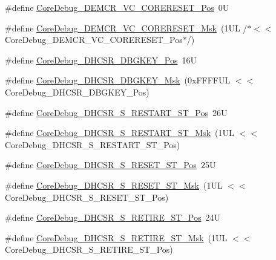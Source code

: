 \begin{DoxyCompactItemize}
\item 
\#define \mbox{\hyperlink{group___c_m_s_i_s___core_debug_ga9fcf09666f7063a7303117aa32a85d5a}{Core\+Debug\+\_\+\+D\+E\+M\+C\+R\+\_\+\+V\+C\+\_\+\+C\+O\+R\+E\+R\+E\+S\+E\+T\+\_\+\+Pos}}~0U
\item 
\#define \mbox{\hyperlink{group___c_m_s_i_s___core_debug_ga906476e53c1e1487c30f3a1181df9e30}{Core\+Debug\+\_\+\+D\+E\+M\+C\+R\+\_\+\+V\+C\+\_\+\+C\+O\+R\+E\+R\+E\+S\+E\+T\+\_\+\+Msk}}~(1\+U\+L /$\ast$$<$$<$ Core\+Debug\+\_\+\+D\+E\+M\+C\+R\+\_\+\+V\+C\+\_\+\+C\+O\+R\+E\+R\+E\+S\+E\+T\+\_\+\+Pos$\ast$/)
\item 
\#define \mbox{\hyperlink{group___c_m_s_i_s___core_debug_gac91280edd0ce932665cf75a23d11d842}{Core\+Debug\+\_\+\+D\+H\+C\+S\+R\+\_\+\+D\+B\+G\+K\+E\+Y\+\_\+\+Pos}}~16U
\item 
\#define \mbox{\hyperlink{group___c_m_s_i_s___core_debug_ga1ce997cee15edaafe4aed77751816ffc}{Core\+Debug\+\_\+\+D\+H\+C\+S\+R\+\_\+\+D\+B\+G\+K\+E\+Y\+\_\+\+Msk}}~(0x\+F\+F\+F\+F\+U\+L $<$$<$ Core\+Debug\+\_\+\+D\+H\+C\+S\+R\+\_\+\+D\+B\+G\+K\+E\+Y\+\_\+\+Pos)
\item 
\#define \mbox{\hyperlink{group___c_m_s_i_s___core_debug_gaf6498d32dbe23b8d95a12d2fbc0a65f8}{Core\+Debug\+\_\+\+D\+H\+C\+S\+R\+\_\+\+S\+\_\+\+R\+E\+S\+T\+A\+R\+T\+\_\+\+S\+T\+\_\+\+Pos}}~26U
\item 
\#define \mbox{\hyperlink{group___c_m_s_i_s___core_debug_gabe3254d40aaa482987ff31584d2a3240}{Core\+Debug\+\_\+\+D\+H\+C\+S\+R\+\_\+\+S\+\_\+\+R\+E\+S\+T\+A\+R\+T\+\_\+\+S\+T\+\_\+\+Msk}}~(1\+U\+L $<$$<$ Core\+Debug\+\_\+\+D\+H\+C\+S\+R\+\_\+\+S\+\_\+\+R\+E\+S\+T\+A\+R\+T\+\_\+\+S\+T\+\_\+\+Pos)
\item 
\#define \mbox{\hyperlink{group___c_m_s_i_s___core_debug_ga6f934c5427ea057394268e541fa97753}{Core\+Debug\+\_\+\+D\+H\+C\+S\+R\+\_\+\+S\+\_\+\+R\+E\+S\+E\+T\+\_\+\+S\+T\+\_\+\+Pos}}~25U
\item 
\#define \mbox{\hyperlink{group___c_m_s_i_s___core_debug_gac474394bcceb31a8e09566c90b3f8922}{Core\+Debug\+\_\+\+D\+H\+C\+S\+R\+\_\+\+S\+\_\+\+R\+E\+S\+E\+T\+\_\+\+S\+T\+\_\+\+Msk}}~(1\+U\+L $<$$<$ Core\+Debug\+\_\+\+D\+H\+C\+S\+R\+\_\+\+S\+\_\+\+R\+E\+S\+E\+T\+\_\+\+S\+T\+\_\+\+Pos)
\item 
\#define \mbox{\hyperlink{group___c_m_s_i_s___core_debug_ga2328118f8b3574c871a53605eb17e730}{Core\+Debug\+\_\+\+D\+H\+C\+S\+R\+\_\+\+S\+\_\+\+R\+E\+T\+I\+R\+E\+\_\+\+S\+T\+\_\+\+Pos}}~24U
\item 
\#define \mbox{\hyperlink{group___c_m_s_i_s___core_debug_ga89dceb5325f6bcb36a0473d65fbfcfa6}{Core\+Debug\+\_\+\+D\+H\+C\+S\+R\+\_\+\+S\+\_\+\+R\+E\+T\+I\+R\+E\+\_\+\+S\+T\+\_\+\+Msk}}~(1\+U\+L $<$$<$ Core\+Debug\+\_\+\+D\+H\+C\+S\+R\+\_\+\+S\+\_\+\+R\+E\+T\+I\+R\+E\+\_\+\+S\+T\+\_\+\+Pos)

\end{DoxyCompactItemize}
